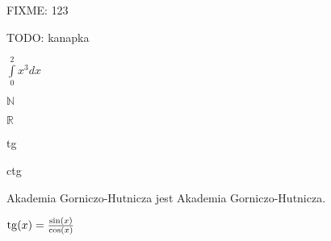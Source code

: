 \documentclass[a4paper, 12pt]{article}
\newcommand{\fixme}[1]{\colorbox{yellow!50}{FIXME: {#1}}}
\newcommand{\todo}[1]{\colorbox{red!20}{TODO: {#1}}}
\newcommand{\myint}[3]{{\ensuremath{\int\limits_{#1}^{#2} {#3} dx}}}
\def \R {$\mathbb{R}$}
\def \N {$\mathbb{N}$}
\def \tg {{\rm tg}}
\def \ctg {{\rm ctg}}
\def \agh {Akademia Gorniczo-Hutnicza}
\begin{document}
\fixme{123}

\todo{kanapka}

\myint{0}{2}{x^3}

\N

\R

\tg

\ctg

{\agh} jest \agh.

$\tg(x) = \frac{\sin(x)}{\cos(x)}$
\end{document}
